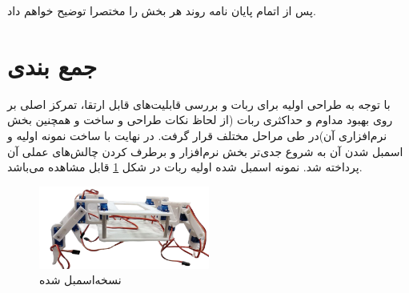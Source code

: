 پس از اتمام پایان نامه روند هر بخش را مختصرا توضیح خواهم داد.
\newpage
\section{جمع بندی}

با توجه به طراحی اولیه برای ربات و بررسی قابلیت‌های قابل ارتقا، تمرکز اصلی بر روی بهبود مداوم و حداکثری ربات (از لحاظ نکات طراحی و ساخت و همچنین بخش نرم‌افزاری آن)در طی مراحل مختلف قرار گرفت. در نهایت با ساخت نمونه اولیه و اسمبل
\noindent\unskip{}
شدن آن به شروع جدی‌تر بخش نرم‌افزار و برطرف کردن چالش‌های عملی آن پرداخته شد.
نمونه اسمبل شده اولیه ربات در شکل
\ref{نسخه‌اسمبل شده}
قابل مشاهده می‌باشد.

\begin{figure}[H]
	\centering
	\includegraphics[width=0.5\textwidth]{./images/Chapter1/Assembled_Robot_without_background}	
	\caption[نسخه‌اسمبل شده]{نسخه‌اسمبل شده}
	\label{نسخه‌اسمبل شده}
\end{figure}
\noindent
\unskip

